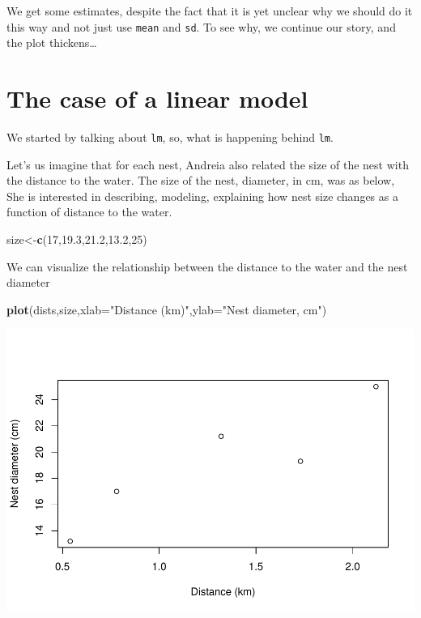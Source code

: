 \documentclass[
]{book}
\newenvironment{Shaded}{\begin{snugshade}}{\end{snugshade}}
\newcommand{\DataTypeTok}[1]{\textcolor[rgb]{0.13,0.29,0.53}{#1}}
\newcommand{\DecValTok}[1]{\textcolor[rgb]{0.00,0.00,0.81}{#1}}
\newcommand{\FloatTok}[1]{\textcolor[rgb]{0.00,0.00,0.81}{#1}}
\newcommand{\KeywordTok}[1]{\textcolor[rgb]{0.13,0.29,0.53}{\textbf{#1}}}
\newcommand{\NormalTok}[1]{#1}
\newcommand{\StringTok}[1]{\textcolor[rgb]{0.31,0.60,0.02}{#1}}
\begin{document}
We get some estimates, despite the fact that it is yet unclear why we should do it this way and not just use \texttt{mean} and \texttt{sd}. To see why, we continue our story, and the plot thickens\ldots{}

\hypertarget{the-case-of-a-linear-model}{%
\section{The case of a linear model}\label{the-case-of-a-linear-model}}

We started by talking about \texttt{lm}, so, what is happening behind \texttt{lm}.

Let's us imagine that for each nest, Andreia also related the size of the nest with the distance to the water. The size of the nest, diameter, in cm, was as below, She is interested in describing, modeling, explaining how nest size changes as a function of distance to the water.

\begin{Shaded}
\begin{Highlighting}[]
\NormalTok{size<-}\KeywordTok{c}\NormalTok{(}\DecValTok{17}\NormalTok{,}\FloatTok{19.3}\NormalTok{,}\FloatTok{21.2}\NormalTok{,}\FloatTok{13.2}\NormalTok{,}\DecValTok{25}\NormalTok{)}
\end{Highlighting}
\end{Shaded}

We can visualize the relationship between the distance to the water and the nest diameter

\begin{Shaded}
\begin{Highlighting}[]
\KeywordTok{plot}\NormalTok{(dists,size,}\DataTypeTok{xlab=}\StringTok{"Distance (km)"}\NormalTok{,}\DataTypeTok{ylab=}\StringTok{"Nest diameter, cm"}\NormalTok{)}
\end{Highlighting}
\end{Shaded}

\includegraphics{ECOMODbook_files/figure-latex/ch13.26-1.pdf}
\end{document}
